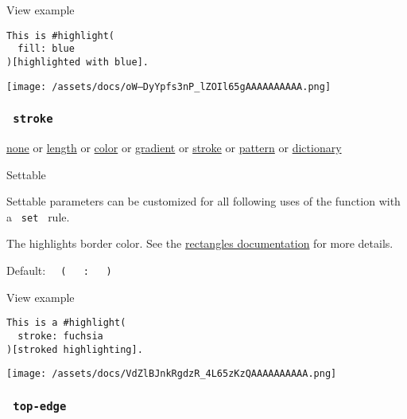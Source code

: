 
View example

\begin{verbatim}
This is #highlight(
  fill: blue
)[highlighted with blue].
\end{verbatim}

\texttt{[image: /assets/docs/oW--DyYpfs3nP\_lZOIl65gAAAAAAAAAA.png]}

\subsubsection{\texorpdfstring{\texttt{\ stroke\ }}{ stroke }}\label{parameters-stroke}

\href{/docs/reference/foundations/none/}{none} {or}
\href{/docs/reference/layout/length/}{length} {or}
\href{/docs/reference/visualize/color/}{color} {or}
\href{/docs/reference/visualize/gradient/}{gradient} {or}
\href{/docs/reference/visualize/stroke/}{stroke} {or}
\href{/docs/reference/visualize/pattern/}{pattern} {or}
\href{/docs/reference/foundations/dictionary/}{dictionary}

{{ Settable }}

\label{parameters-stroke-settable-tooltip}
Settable parameters can be customized for all following uses of the
function with a \texttt{\ set\ } rule.

The highlight\textquotesingle s border color. See the
\href{/docs/reference/visualize/rect/\#parameters-stroke}{rectangle\textquotesingle s
documentation} for more details.

Default:
\texttt{\ }{\texttt{\ (\ }}\texttt{\ }{\texttt{\ :\ }}\texttt{\ }{\texttt{\ )\ }}\texttt{\ }


View example

\begin{verbatim}
This is a #highlight(
  stroke: fuchsia
)[stroked highlighting].
\end{verbatim}

\texttt{[image: /assets/docs/VdZlBJnkRgdzR\_4L65zKzQAAAAAAAAAA.png]}

\subsubsection{\texorpdfstring{\texttt{\ top-edge\ }}{ top-edge }}\label{parameters-top-edge}

